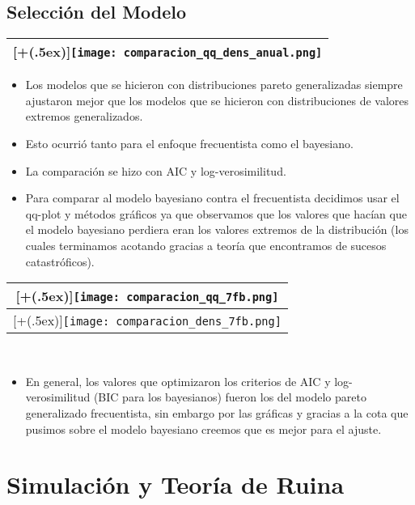 \documentclass[DIV=calc, 
					paper=letter, 
					fontsize=11pt, 
					twocolumn]{scrartcl}
\newcommand*{\addheight}[2][.5ex]{%
  \raisebox{0pt}[\dimexpr\height+(#1)\relax]{#2}%
}
\begin{document}
\subsection{Selecci\'on del Modelo}
\begin{tabular}{|c|}
      \hline
      \addheight{\texttt{[image: comparacion\_qq\_dens\_anual.png]}} \\
      \hline
\end{tabular}

\begin{itemize}
\item Los modelos que se hicieron con distribuciones pareto generalizadas siempre ajustaron mejor que los modelos que se hicieron con distribuciones de valores extremos generalizados.
\item Esto ocurri\'o tanto para el enfoque frecuentista como el bayesiano.
\item La comparaci\'on se hizo con AIC y log-verosimilitud.
\item Para comparar al modelo bayesiano contra el frecuentista decidimos usar el qq-plot y m\'etodos gr\'aficos ya que observamos que los valores que hac\'ian que el modelo bayesiano perdiera eran los valores extremos de la distribuci\'on (los cuales terminamos acotando gracias a teor\'ia que encontramos de sucesos catastr\'oficos).
\end{itemize}

\begin{tabular}{|c|}
      \hline
      \addheight{\texttt{[image: comparacion\_qq\_7fb.png]}} \\
      \hline
       \addheight{\texttt{[image: comparacion\_dens\_7fb.png]}}\\
      \hline
      \hline
\end{tabular}\\
\begin{itemize}
\item En general, los valores que optimizaron los criterios de AIC y log-verosimilitud (BIC para los bayesianos) fueron los del modelo pareto generalizado frecuentista, sin embargo por las gr\'aficas y gracias a la cota que pusimos sobre el modelo bayesiano creemos que es mejor para el ajuste. 
\end{itemize}

\section{Simulaci\'on y Teor\'ia de Ruina}
\end{document}
